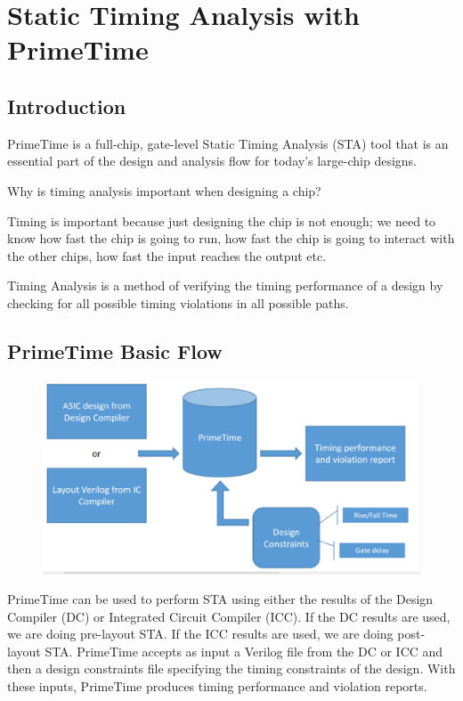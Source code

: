 \documentclass[a4paper,12pt,twoside]{article}
\begin{document}
\newpage
\section{Static Timing Analysis with PrimeTime}\label{SSTA}
\subsection{Introduction}
PrimeTime is a full-chip, gate-level Static Timing Analysis (STA) tool that is an essential part of the design and analysis flow for today's large-chip designs.

Why is timing analysis important when designing a chip?

Timing is important because just designing the chip is not enough; we need to know how fast the chip is going to run, how fast the chip is going to interact with the other chips, how fast the input reaches the output etc.

Timing Analysis is a method of verifying the timing performance of a design by checking for all possible timing violations in all possible paths.
\subsection{PrimeTime Basic Flow}
\begin{figure}[H]
    \centering
    \includegraphics[width=\textwidth]{images/31.png}
\end{figure}
PrimeTime can be used to perform STA using either the results of the Design Compiler (DC) or Integrated Circuit Compiler (ICC). If the DC results are used, we are doing pre-layout STA. If the ICC results are used, we are doing post-layout STA. PrimeTime accepts as input a Verilog file from the DC or ICC and then a design constraints file specifying the timing constraints of the design. With these inputs, PrimeTime produces timing performance and
violation reports.
\end{document}
